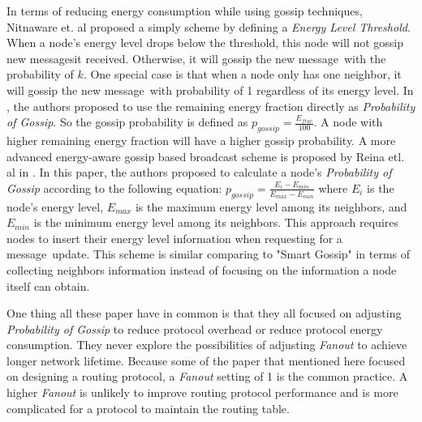 \documentclass[onehalf,11pt]{beavtex}
\newcommand{\pog}{Probability of Gossip}
\newcommand{\msgs}{messages}
\newcommand{\msg}{message}
\begin{document}
In terms of reducing energy consumption while using gossip techniques, Nitnaware et. al \cite{nitnaware2009performance} proposed a simply scheme by defining a \emph{Energy Level Threshold}. When a node's energy level drops below the threshold, this node will not gossip new \msgs it received. Otherwise, it will gossip the new \msg ~with the probability of $k$. One special case is that when a node only has one neighbor, it will gossip the new \msg ~with probability of 1 regardless of its energy level. In \cite{nitnaware2010energy}, the authors proposed to use the remaining energy fraction directly as \emph{\pog}. So the gossip probability is defined as $p_{gossip}=\frac{E_{frac}}{100}$. A node with higher remaining energy fraction will have a higher gossip probability. A more advanced energy-aware gossip based broadcast scheme is proposed by Reina etl. al in \cite{reina2012optimization}. In this paper, the authors proposed to calculate a node's \emph{\pog} according to the following equation: $p_{gossip}=\frac{E_i - E_{min}}{E_{max}-E_{min}}$ where $E_i$ is the node's energy level, $E_{max}$ is the maximum energy level among its neighbors, and $E_{min}$ is the minimum energy level among its neighbors. This approach requires nodes to insert their energy level information when requesting for a \msg ~update. This scheme is similar comparing to "Smart Gossip" in terms of collecting neighbors information instead of focusing on the information a node itself can obtain. 


One thing all these paper have in common is that they all focused on adjusting \emph{\pog} to reduce protocol overhead or reduce protocol energy consumption. They never explore the possibilities of adjusting \emph{Fanout} to achieve longer network lifetime. Because some of the paper that mentioned here focused on designing a routing protocol, a \emph{Fanout} setting of 1 is the common practice. A higher \emph{Fanout} is unlikely to improve routing protocol performance and is more complicated for a protocol to maintain the routing table. 

\end{document}
